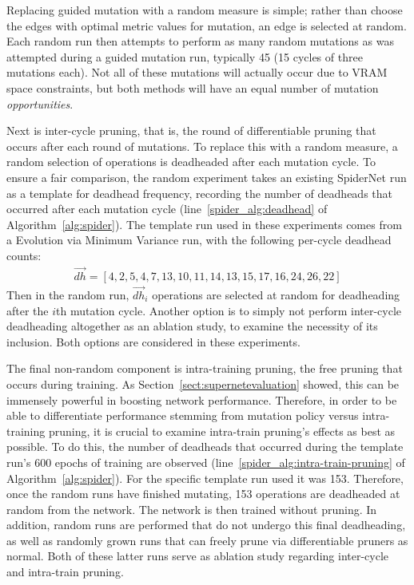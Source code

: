 Replacing guided mutation with a random measure is simple; rather than choose the edges with optimal metric values for
mutation, an edge is selected at random. Each random run then attempts to perform as many random mutations as was attempted
during a guided mutation run, typically 45 (15 cycles of three mutations each).
Not all of these mutations will actually occur due to VRAM space constraints, but both methods will have an equal number of mutation
\textit{opportunities}.

Next is inter-cycle pruning, that is, the round of differentiable pruning that occurs after each round of mutations.
To replace this with a random measure, a random selection of operations is deadheaded after each mutation cycle.
To ensure a fair comparison, the random experiment takes an existing SpiderNet run as a template for deadhead frequency, recording the
number of deadheads that occurred after each mutation cycle (line~\ref{spider_alg:deadhead} of Algorithm~\ref{alg:spider}).
The template run used in these experiments comes from a Evolution via Minimum Variance run, with the following per-cycle deadhead counts:
\begin{align*}
    \vec{dh} = [4,   2,   5,   4,   7,  13,  10,  11,  14,  13,  15,  17,  16, 24,  26,  22]
\end{align*}
\noindent Then in the random run, $\vec{dh}_i$ operations are selected at random for deadheading after the $i$th mutation
cycle. Another option is to simply not perform inter-cycle deadheading altogether as an ablation study,
to examine the necessity of its inclusion. Both options are considered in these experiments.

The final non-random component is intra-training pruning, the free pruning that occurs during training. As Section~\ref{sect:supernetevaluation}
showed, this can be immensely powerful in boosting network performance. Therefore, in order to be able to differentiate
performance stemming from mutation policy versus intra-training pruning, it is crucial to examine intra-train pruning's effects
as best as possible. To do this, the number of deadheads that occurred during the template run's
600 epochs of training are observed (line~\ref{spider_alg:intra-train-pruning} of Algorithm~\ref{alg:spider}). For the specific template
run used it was 153. Therefore, once the random runs have finished mutating, 153 operations are deadheaded at random
from the network. The network is then trained without pruning. In addition, random runs are performed that do not undergo
this final deadheading, as well as randomly grown runs that can freely prune via differentiable pruners as normal. Both of these
latter runs serve as ablation study regarding inter-cycle and intra-train pruning.

